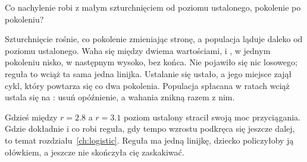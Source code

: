 \begin{think}
Co nachylenie  robi z małym szturchnięciem od poziomu
ustalonego, pokolenie po pokoleniu?
\end{think}




\noindent
Szturchnięcie rośnie, co pokolenie zmieniając stronę, a populacja ląduje
daleko od poziomu ustalonego. Waha się między dwiema wartościami,
 i , w jednym pokoleniu nisko, w
następnym wysoko, bez końca. Nie pojawiło się nic losowego; reguła to wciąż
ta sama jedna linijka. Ustalanie się ustało, a jego miejsce zajął cykl, który
powtarza się co dwa pokolenia. Populacja spłacana w ratach wciąż ustala się
na : usuń opóźnienie, a wahania znikną razem z nim.

Gdzieś między $r = \num{2.8}$ a $r = \num{3.1}$ poziom ustalony stracił
swoją moc przyciągania. Gdzie dokładnie i co robi reguła, gdy tempo wzrostu
podkręca się jeszcze dalej, to temat rozdziału~\ref{ch:logistic}. Reguła ma
jedną linijkę, dziecko policzyłoby ją ołówkiem, a jeszcze nie skończyła cię
zaskakiwać.

